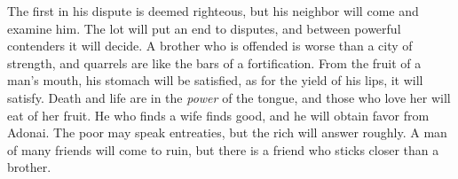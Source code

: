 \begin{biblechapter}
\verse The first in his dispute is deemed righteous, 
but his neighbor will come and examine him.
\verse The lot will put an end to disputes, 
and between powerful contenders it will decide.
\verse A brother who is offended is worse than a city of strength, 
and quarrels are like the bars of a fortification.
\verse From the fruit of a man’s mouth, his stomach will be satisfied, 
as for the yield of his lips, it will satisfy.
\verse Death and life are in the \textit{power} of the tongue, 
and those who love her will eat of her fruit.
\verse He who finds a wife finds good, 
and he will obtain favor from Adonai.
\verse The poor may speak entreaties, 
but the rich will answer roughly.
\verse A man of many friends will come to ruin, 
but there is a friend who sticks closer than a brother.
\end{biblechapter}

